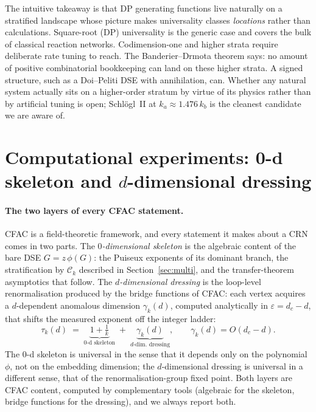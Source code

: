 \documentclass[11pt,a4paper]{article}
\theoremstyle{plain}
\theoremstyle{definition}
\begin{document}
The intuitive takeaway is that DP generating functions live
naturally on a stratified landscape whose picture makes
universality classes \emph{locations} rather than calculations.
Square-root (DP) universality is the generic case and covers
the bulk of classical reaction networks.  Codimension-one and
higher strata require deliberate rate tuning to reach.  The
Banderier--Drmota theorem says: no amount of positive
combinatorial bookkeeping can land on these higher strata.  A
signed structure, such as a Doi--Peliti DSE with annihilation,
can.  Whether any natural system actually sits on a
higher-order stratum by virtue of its physics rather than by
artificial tuning is open; Schl\"ogl~II at $k_a\!\approx\!1.476\,k_b$
is the cleanest candidate we are aware of.

\section{Computational experiments: 0-d skeleton and $d$-dimensional dressing}
\label{app:experiments}

\paragraph{The two layers of every CFAC statement.}
CFAC is a field-theoretic framework, and every statement it makes
about a CRN comes in two parts.  The \emph{$0$-dimensional skeleton}
is the algebraic content of the bare DSE $G = z\,\phi(G)$: the
Puiseux exponents of its dominant branch, the stratification by
$\mathcal{C}_{k}$ described in Section~\ref{sec:multi}, and the
transfer-theorem asymptotics that follow.  The \emph{$d$-dimensional
dressing} is the loop-level renormalisation produced by the bridge
functions of CFAC: each vertex acquires a $d$-dependent anomalous
dimension $\gamma_{k}(d)$, computed analytically in $\varepsilon =
d_{c} - d$, that shifts the measured exponent off the integer
ladder:
\begin{equation}
  \tau_{k}(d) \;=\; \underbrace{1 + \tfrac{1}{k}}_{\text{0-d skeleton}}
  \;+\; \underbrace{\gamma_{k}(d)}_{\text{$d$-dim. dressing}},
  \qquad \gamma_{k}(d) = O(d_{c} - d).
  \label{eq:two-layer}
\end{equation}
The 0-d skeleton is universal in the sense that it depends only
on the polynomial $\phi$, not on the embedding dimension; the
$d$-dimensional dressing is universal in a different sense, that
of the renormalisation-group fixed point.  Both layers are CFAC
content, computed by complementary tools (algebraic for the
skeleton, bridge functions for the dressing), and we always
report both.
\end{document}
